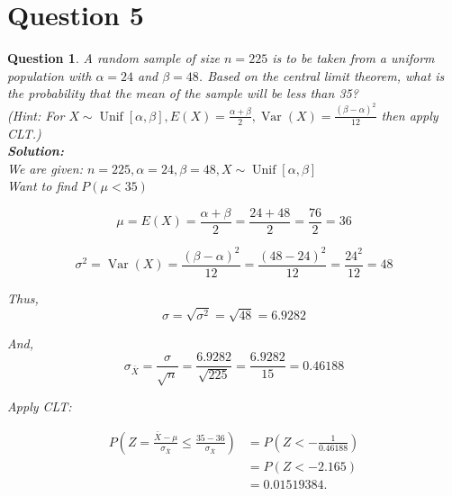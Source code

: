 \documentclass{article}
\theoremstyle{questionstyle}
\newtheorem{myquestion}{Question}
\begin{document}

\section{Question 5}
\begin{myquestion}
    A random sample of size $n = 225$ is to be taken from a uniform population with \(\alpha = 24\) and \(\beta = 48\). Based on the central limit theorem, what is the probability that the mean of the sample will be less than 35?\\

    (Hint: For \(X \sim \operatorname{Unif}[\alpha, \beta], E(X) = \frac{\alpha + \beta}{2}, \operatorname{Var}(X) = \frac{(\beta - \alpha)^2}{12}\) then apply CLT.)\\

\textbf{Solution:}\\

We are given: \(n = 225, \alpha=24, \beta=48, X \sim \operatorname{Unif}[\alpha, \beta]\) \\ 

Want to find \(P( \mu < 35 )\)

\[ \mu = E(X) = \frac{\alpha + \beta}{2} = \frac{24 + 48}{2} = \frac{76}{2} = 36\]

\[ \sigma^2 = \operatorname{Var}(X) = \frac{(\beta - \alpha)^2}{12} = \frac{(48-24)^2}{12} = \frac{24^2}{12} = 48\]

Thus, \[ \sigma = \sqrt{\sigma^2} = \sqrt{48} = 6.9282 \]

And, 
\[\sigma_{\bar{X}} = \frac{\sigma}{\sqrt{n}} = \frac{6.9282}{\sqrt{225}} = \frac{6.9282}{15} = 0.46188 \]

Apply CLT:

\begin{align*}
    P\left(Z = \frac{\bar{X} - \mu}{\sigma_{\bar{X}}} \leq \frac{35 - 36}{\sigma_{\bar{X}}}\right) &= P\left(Z < -\frac{1}{0.46188}\right) \\
    &= P(Z < -2.165) \\
    &= 0.01519384.
\end{align*}

\end{myquestion}

\end{document}
